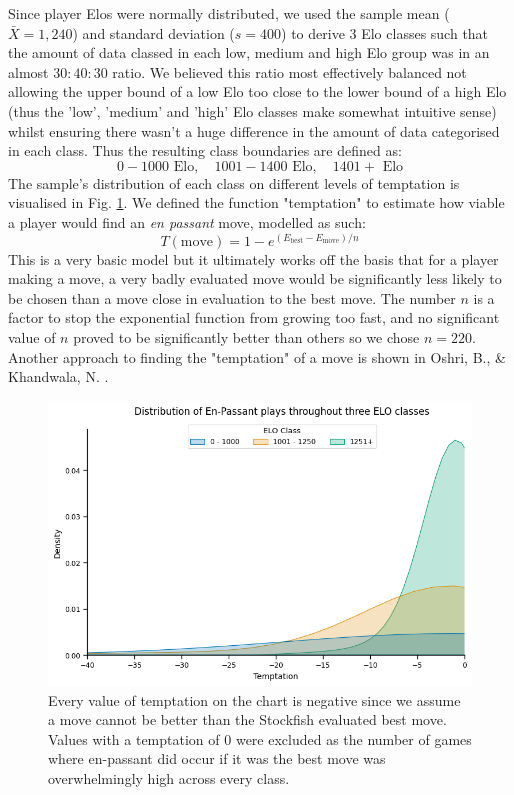 \documentclass[10pt,a4paper]{article}
\begin{document}
\begin{multicols}{2}
Since player Elos were normally distributed, we used the sample mean ($\bar{X} = 1,240$) and standard deviation ($s = 400$) to derive $3$ Elo classes such that the amount of data classed in each low, medium and high Elo group was in an almost $30:40:30$ ratio. We believed this ratio most effectively balanced not allowing the upper bound of a low Elo too close to the lower bound of a high Elo (thus the 'low', 'medium' and 'high' Elo classes make somewhat intuitive sense) whilst ensuring there wasn't a huge difference in the amount of data categorised in each class. Thus the resulting class boundaries are defined as: 
$$0 - 1000 \text{ Elo},\quad 1001 - 1400 \text{ Elo},\quad 1401+ \text{ Elo}$$
The sample's distribution of each class on different levels of temptation is visualised in Fig. \ref{fds-project-template:fig:ep_distplot}. We defined the function "temptation" to estimate how viable a player would find an \textit{en passant} move, modelled as such:
$$T(\text{move})= 1 -e^{(E_{\text{best}} - E_{\text{move}})/{n}}$$
This is a very basic model but it ultimately works off the basis that for a player making a move, a very badly evaluated move would be significantly less likely to be chosen than a move close in evaluation to the best move. The number $n$ is a factor to stop the exponential function from growing too fast, and no significant value of $n$ proved to be significantly better than others so we chose $n=220$. Another approach to finding the "temptation" of a move is shown in Oshri, B., \& Khandwala, N. \cite{mcilroy2022learning}.\newline

\begin{figure}[t]
  \centering
  \includegraphics[width=\textwidth]{report/images/ep_distplot.png}
  \caption{Every value of temptation on the chart is negative since we assume a move cannot be better than the Stockfish evaluated best move. Values with a temptation of $0$ were excluded as the number of games where en-passant did occur if it was the best move was overwhelmingly high across every class.}
  \label{fds-project-template:fig:ep_distplot}
\end{figure}


\end{multicols}
\end{document}
